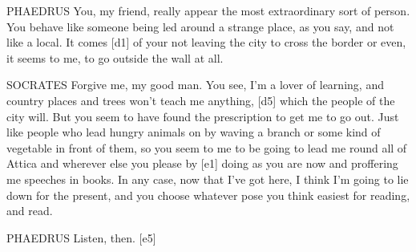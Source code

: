 PHAEDRUS You, my friend, really appear the most
extraordinary sort of
person. You behave like someone being led around a strange place, as you
say, and not like a local. It comes {[}d1{]} of your not leaving the
city to cross the border or even, it seems to me, to go outside the wall
at all.

SOCRATES Forgive me, my good man. You see, I'm a lover of learning, and
country places and trees won't teach me anything, {[}d5{]} which the
people of the city will.
But you seem to have found the
prescription to get me to
go out. Just like people who lead hungry animals on by waving a branch
or some kind of vegetable in front of them, so you seem to me to be
going to lead me round all of Attica and wherever else you please by
{[}e1{]} doing as you are now and proffering me speeches in
books. In any case, now
that I've got here, I think I'm going to lie down for the present, and
you choose whatever pose you think easiest for reading, and read.

PHAEDRUS Listen, then.
{[}e5{]}

